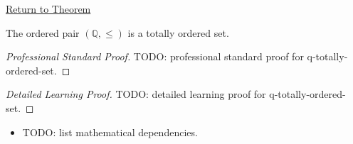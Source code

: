 \newpage
{}
\label{prf:q-totally-ordered-set}

\begin{remark*}[Return]
\hyperref[thm:q-totally-ordered-set]{Return to Theorem}
\end{remark*}

\begin{theorem*}
The ordered pair $(\mathbb{Q},\le)$ is a totally ordered set.
\end{theorem*}

\begin{proof}[Professional Standard Proof]
\LRAProofBodyStart
TODO: professional standard proof for q-totally-ordered-set.
\end{proof}

\begin{proof}[Detailed Learning Proof]
\LRAProofBodyStart
TODO: detailed learning proof for q-totally-ordered-set.
\end{proof}

\begin{remark*}
\end{remark*}

\begin{dependencies}
\begin{itemize}
  \item TODO: list mathematical dependencies.
\end{itemize}
\end{dependencies}

\clearpage
